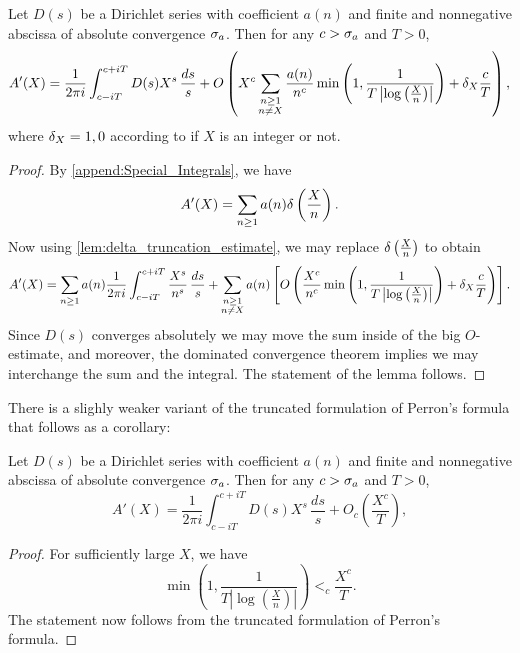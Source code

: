       \begin{theorem}
        Let $D(s)$ be a Dirichlet series with coefficient $a(n)$ and finite and nonnegative abscissa of absolute convergence $\sigma_{a}$. Then for any $c > \sigma_{a}$ and $T > 0$,
        \[
          A'(X) = \frac{1}{2\pi i}\int_{c-iT}^{c+iT}D(s)X^{s}\,\frac{ds}{s}+O\left(X^{c}\sum_{\substack{n \ge 1 \\ n \neq X}}\frac{a(n)}{n^{c}}\min\left(1,\frac{1}{T\left|\log\left(\frac{X}{n}\right)\right|}\right)+\delta_{X}\frac{c}{T}\right),
        \]
        where $\delta_{X} = 1,0$ according to if $X$ is an integer or not.
      \end{theorem}
      \begin{proof}
        By \cref{append:Special_Integrals}, we have
        \[
          A'(X) = \sum_{n \ge 1}a(n)\delta\left(\frac{X}{n}\right).
        \]
        Now using \cref{lem:delta_truncation_estimate}, we may replace $\delta\left(\frac{X}{n}\right)$ to obtain
        \[
          A'(X) = \sum_{n \ge 1}a(n)\frac{1}{2\pi i}\int_{c-iT}^{c+iT}\frac{X^{s}}{n^{s}}\,\frac{ds}{s}+\sum_{\substack{n \ge 1 \\ n \neq X}}a(n)\left[O\left(\frac{X^{c}}{n^{c}}\min\left(1,\frac{1}{T\left|\log\left(\frac{X}{n}\right)\right|}\right)+\delta_{X}\frac{c}{T}\right)\right].
        \]
        Since $D(s)$ converges absolutely we may move the sum inside of the big $O$-estimate, and moreover, the dominated convergence theorem implies we may interchange the sum and the integral. The statement of the lemma follows.
      \end{proof}

      There is a slighly weaker variant of the truncated formulation of Perron's formula that follows as a corollary:

      \begin{corollary}
        Let $D(s)$ be a Dirichlet series with coefficient $a(n)$ and finite and nonnegative abscissa of absolute convergence $\sigma_{a}$. Then for any $c > \sigma_{a}$ and $T > 0$,
        \[
          A'(X) = \frac{1}{2\pi i}\int_{c-iT}^{c+iT}D(s)X^{s}\,\frac{ds}{s}+O_{c}\left(\frac{X^{c}}{T}\right),
        \]
      \end{corollary}
      \begin{proof}
        For sufficiently large $X$, we have
        \[
          \min\left(1,\frac{1}{T\left|\log\left(\frac{X}{n}\right)\right|}\right) <_{c} \frac{X^{c}}{T}.
        \]
        The statement now follows from the truncated formulation of Perron's formula.
      \end{proof}

